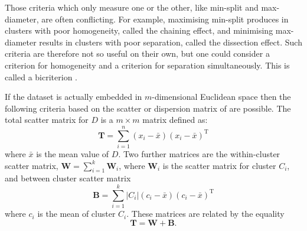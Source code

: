 \documentclass[a4paper]{report}
\newcommand{\dset}{D}
\begin{document}
Those criteria which only measure one or the other, like min-split and
max-diameter, are often conflicting.  For example, maximising min-split
produces in clusters with poor homogeneity, called the chaining effect, and
minimising max-diameter results in clusters with poor separation, called the
dissection effect.  Such criteria are therefore not so useful on their own,
but one could consider a criterion for homogeneity and a criterion for
separation simultaneously.  This is called a bicriterion
\citep{delattre1980bicriterion}.

If the dataset is actually embedded in $m$-dimensional Euclidean space then
the following criteria based on the scatter or dispersion matrix of
\citet{wilks60} are possible.  The total scatter matrix for $\dset$ is a $m
\times m$ matrix defined
as:
\begin{equation*}
  \mathbf{T} = \sum_{i=1}^{n} (x_i - \bar{x})(x_i - \bar{x})^{\mathrm{T}}
\end{equation*}
where $\bar{x}$ is the mean value of $\dset$.  Two further matrices are
the within-cluster scatter matrix, $\mathbf{W} = \sum_{i=1}^{k} \mathbf{W}_i$,
where $\mathbf{W}_i$ is the scatter matrix for cluster $C_i$, and between
cluster scatter matrix
\begin{equation*}
  \mathbf{B} =
  \sum_{i=1}^{k} |C_i| (c_i - \bar{x}) (c_i - \bar{x})^{\mathrm{T}}
\end{equation*}
where $c_i$ is the mean of cluster $C_i$.  These matrices are related by the
equality
\begin{equation*}
  \mathbf{T} = \mathbf{W} + \mathbf{B}.
\end{equation*}
\end{document}
